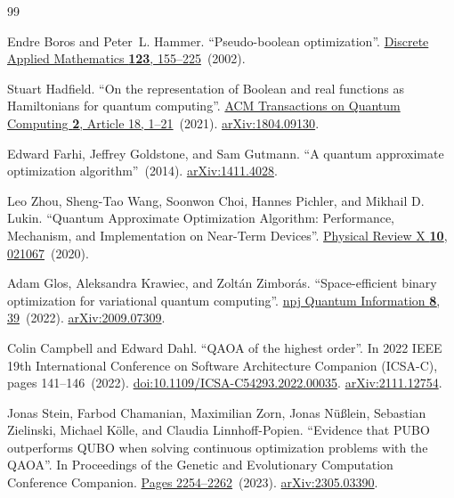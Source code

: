\documentclass[a4paper,onecolumn,11pt,unpublished]{quantumarticle}
\theoremstyle{remark}
\begin{document}
\begingroup
\small
\begin{thebibliography}{99}

Endre Boros and Peter~L. Hammer.
\newblock ``Pseudo-boolean optimization''.
\newblock \href{https://dx.doi.org/10.1016/S0166-218X(01)00341-9}{Discrete Applied Mathematics {\bf 123}, 155--225}~(2002).

Stuart Hadfield.
\newblock ``On the representation of Boolean and real functions as Hamiltonians for quantum computing''.
\newblock \href{https://dx.doi.org/10.1145/3478519}{ACM Transactions on Quantum Computing {\bf 2}, Article 18, 1--21}~(2021).
\newblock \href{http://arxiv.org/abs/1804.09130}{arXiv:1804.09130}.

Edward Farhi, Jeffrey Goldstone, and Sam Gutmann.
\newblock ``A quantum approximate optimization algorithm''~(2014).
\newblock \href{http://arxiv.org/abs/1411.4028}{arXiv:1411.4028}.

Leo Zhou, Sheng-Tao Wang, Soonwon Choi, Hannes Pichler, and Mikhail D. Lukin.
\newblock ``Quantum Approximate Optimization Algorithm: Performance, Mechanism, and Implementation on Near-Term Devices''.
\newblock \href{https://doi.org/10.1103/physrevx.10.021067}{Physical Review X {\bf 10}, 021067}~(2020).


Adam Glos, Aleksandra Krawiec, and Zolt{\'a}n Zimbor{\'a}s.
\newblock ``Space-efficient binary optimization for variational quantum computing''.
\newblock \href{https://dx.doi.org/10.1038/s41534-022-00546-y}{npj Quantum Information {\bf 8}, 39}~(2022).
\newblock \href{http://arxiv.org/abs/2009.07309}{arXiv:2009.07309}.

Colin Campbell and Edward Dahl.
\newblock ``QAOA of the highest order''.
\newblock In 2022 IEEE 19th International Conference on Software Architecture Companion (ICSA-C), pages 141--146~(2022).
\newblock \href{https://dx.doi.org/10.1109/ICSA-C54293.2022.00035}{doi:10.1109/ICSA-C54293.2022.00035}.
\newblock \href{http://arxiv.org/abs/2111.12754}{arXiv:2111.12754}.

Jonas Stein, Farbod Chamanian, Maximilian Zorn, Jonas N{\"u}{\ss}lein, Sebastian Zielinski, Michael K{\"o}lle, and Claudia Linnhoff-Popien.
\newblock ``Evidence that PUBO outperforms QUBO when solving continuous optimization problems with the QAOA''.
\newblock In Proceedings of the Genetic and Evolutionary Computation Conference Companion.
\newblock \href{https://dx.doi.org/10.1145/3583133.3596358}{Pages 2254--2262}~(2023).
\newblock \href{http://arxiv.org/abs/2305.03390}{arXiv:2305.03390}.


\end{thebibliography}
\end{document}
